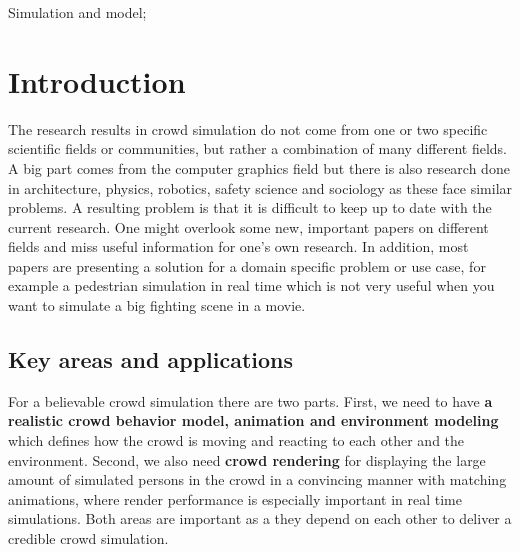\documentclass{acmsiggraph}               %
\begin{document}
\begin{CRcatlist}
{Simulation and model}{};
\end{CRcatlist}

\keywordlist

\section{Introduction}


\copyrightspace


The research results in crowd simulation do not come from one or two specific scientific fields or communities, but rather a combination of many different fields. A big part comes from the computer graphics field but there is also research done in architecture, physics, robotics, safety science and sociology as these face similar problems. A resulting problem is that it is difficult to keep up to date with the current research. One might overlook some new, important papers on different fields and miss useful information for one's own research. In addition, most papers are presenting a solution for a domain specific problem or use case, for example a pedestrian simulation in real time \cite{karamouzas_predictive_2009} which is not very useful when you want to simulate a big fighting scene in a movie.

\subsection{Key areas and applications}
\label{chap:key_areas}
For a believable crowd simulation there are two parts. First, we need to have \textbf{a realistic crowd behavior model, animation and environment modeling} which defines how the crowd is moving and reacting to each other and the environment. Second, we also need \textbf{crowd rendering} for displaying the large amount of simulated persons in the crowd in a convincing manner with matching animations, where render performance is especially important in real time simulations. Both areas are important as a they depend on each other to deliver a credible crowd simulation.
\end{document}
